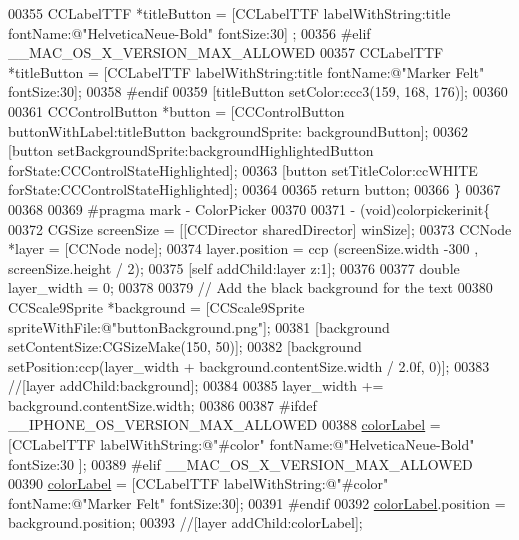\begin{DoxyCode}
{{{00355 \textcolor{preprocessor}{}    CCLabelTTF *titleButton = [CCLabelTTF labelWithString:title fontName:@"HelveticaNeue-Bold" fontSize:30]
      ;
00356 \textcolor{preprocessor}{#elif \_\_MAC\_OS\_X\_VERSION\_MAX\_ALLOWED}
00357 \textcolor{preprocessor}{}    CCLabelTTF *titleButton = [CCLabelTTF labelWithString:title fontName:@"Marker Felt" fontSize:30];
00358 \textcolor{preprocessor}{#endif}
00359 \textcolor{preprocessor}{}    [titleButton setColor:ccc3(159, 168, 176)];
00360     
00361     CCControlButton *button = [CCControlButton buttonWithLabel:titleButton backgroundSprite:
      backgroundButton];
00362     [button setBackgroundSprite:backgroundHighlightedButton forState:CCControlStateHighlighted];
00363     [button setTitleColor:ccWHITE forState:CCControlStateHighlighted];
00364     
00365     \textcolor{keywordflow}{return} button;
00366 \}
00367 
00368 
00369 \textcolor{preprocessor}{#pragma mark - ColorPicker}
00370 \textcolor{preprocessor}{}
00371 - (void)colorpickerinit\{
00372     CGSize screenSize = [[CCDirector sharedDirector] winSize];
00373     CCNode *layer                       = [CCNode node];
00374     layer.position                      = ccp (screenSize.width -300 , screenSize.height / 2);
00375     [\textcolor{keyword}{self} addChild:layer z:1];
00376     
00377     \textcolor{keywordtype}{double} layer\_width = 0;
00378     
00379     \textcolor{comment}{// Add the black background for the text}
00380     CCScale9Sprite *background = [CCScale9Sprite spriteWithFile:@"buttonBackground.png"];
00381     [background setContentSize:CGSizeMake(150, 50)];
00382     [background setPosition:ccp(layer\_width + background.contentSize.width / 2.0f, 0)];
00383     \textcolor{comment}{//[layer addChild:background];}
00384     
00385     layer\_width += background.contentSize.width;
00386     
00387 \textcolor{preprocessor}{#ifdef \_\_IPHONE\_OS\_VERSION\_MAX\_ALLOWED}
00388 \textcolor{preprocessor}{}    \hyperlink{interface_controls_layer_aa3d424dcbfa618632f97478ee61148cb}{colorLabel} = [CCLabelTTF labelWithString:@"#color" fontName:@"HelveticaNeue-Bold" fontSize:30
      ];
00389 \textcolor{preprocessor}{#elif \_\_MAC\_OS\_X\_VERSION\_MAX\_ALLOWED}
00390 \textcolor{preprocessor}{}    \hyperlink{interface_controls_layer_aa3d424dcbfa618632f97478ee61148cb}{colorLabel} = [CCLabelTTF labelWithString:@"#color" fontName:@"Marker Felt" fontSize:30];
00391 \textcolor{preprocessor}{#endif}
00392 \textcolor{preprocessor}{}    \hyperlink{interface_controls_layer_aa3d424dcbfa618632f97478ee61148cb}{colorLabel}.position = background.position;
00393     \textcolor{comment}{//[layer addChild:colorLabel];}
}}}
\end{DoxyCode}

